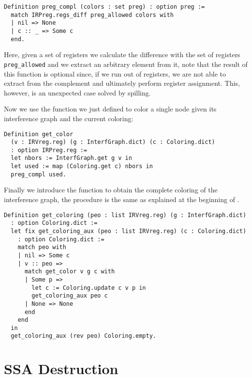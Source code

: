 \begin{lstlisting}[style=Coq]
Definition preg_compl (colors : set preg) : option preg :=
  match IRPreg.regs_diff preg_allowed colors with
  | nil => None
  | c :: _ => Some c
  end.
\end{lstlisting}

Here, given a set of registers we calculate the difference with the set of registers \texttt{preg\_allowed} and we extract an arbitrary element from it, note that the result of this function is optional since, if we run out of registers, we are not able to extract from the complement and ultimately perform register assignment. This, however, is an unexpected case solved by spilling.

Now we use the function we just defined to color a single node given its interference graph and the current coloring:

\begin{lstlisting}[style=Coq]
Definition get_color
  (v : IRVreg.reg) (g : InterfGraph.dict) (c : Coloring.dict)
  : option IRPreg.reg :=
  let nbors := InterfGraph.get g v in
  let used := map (Coloring.get c) nbors in
  preg_compl used.
\end{lstlisting}

Finally we introduce the function to obtain the complete coloring of the interference graph, the procedure is the same as explained at the beginning of .

\begin{lstlisting}[style=Coq]
Definition get_coloring (peo : list IRVreg.reg) (g : InterfGraph.dict)
  : option Coloring.dict :=
  let fix get_coloring_aux (peo : list IRVreg.reg) (c : Coloring.dict)
    : option Coloring.dict :=
    match peo with
    | nil => Some c
    | v :: peo =>
      match get_color v g c with
      | Some p =>
        let c := Coloring.update c v p in
        get_coloring_aux peo c
      | None => None
      end
    end
  in
  get_coloring_aux (rev peo) Coloring.empty.
\end{lstlisting}

\section{SSA Destruction}
\label{sec:destruct}

